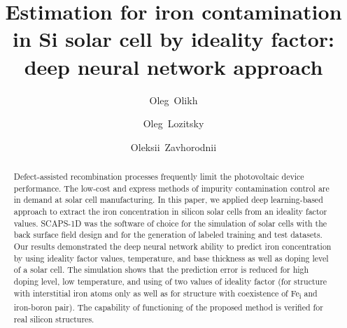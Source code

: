 \documentclass[num-refs]{wiley-article} %
\title{Estimation for iron contamination in Si solar cell by ideality factor: deep neural network approach}
\author[1]{Oleg~Olikh}
\author[1]{Oleg~Lozitsky}
\author[1]{Oleksii~Zavhorodnii}
\affil[1]{Taras Shevchenko National University of Kyiv, 64/13, Volodymyrska Street, Kyiv, 01601, Ukraine}
\begin{document}
\begin{frontmatter}
\maketitle

\begin{abstract}
Defect-assisted recombination processes frequently
limit the photovoltaic device performance.
The low-cost and express methods of impurity contamination control
are in demand at solar cell manufacturing.
In this paper, we applied deep learning-based
approach to extract the iron concentration in silicon solar cells from an
ideality factor values.
SCAPS-1D was the software of choice for the simulation of solar cells with the back surface field design
and for the generation of labeled training and test datasets.
Our results demonstrated the deep neural network ability
to predict iron concentration by using ideality factor values, temperature, and base thickness as well as doping level of a solar cell.
The simulation shows that the prediction error
is reduced for high doping level, low temperature, and using of two values of ideality factor (for structure with interstitial iron atoms only as well as for structure with
coexistence of Fe\textsubscript{i} and iron-boron pair).
The capability of functioning of the proposed method is verified for real silicon structures.


\end{abstract}

\end{frontmatter}

\end{document}
